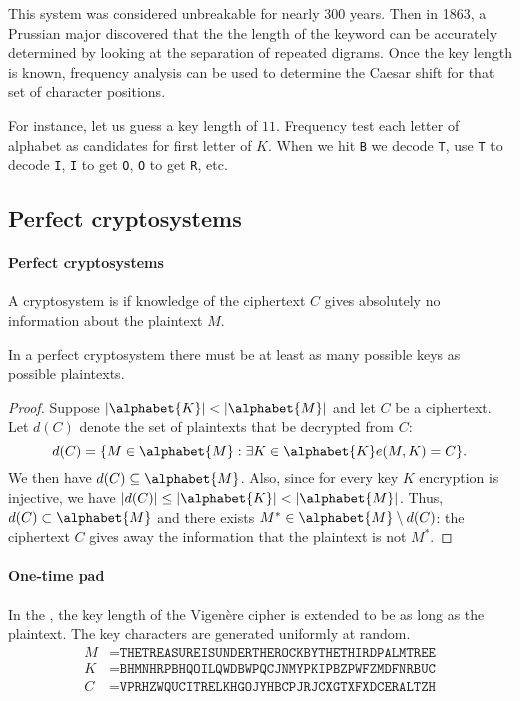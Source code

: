 \documentclass[a4paper, 11pt, openany]{book}
\begin{document}
This system was considered unbreakable for nearly 300 years. Then in 1863, a Prussian major discovered that the the length of the keyword can be accurately determined by looking at the separation of repeated digrams. Once the key length is known, frequency analysis can be used to determine the Caesar shift for that set of character positions.

For instance, let us guess a key length of $11$.
Frequency test each letter of alphabet as candidates for first letter of $K$. When we hit \texttt{B} we decode \texttt{T}, use \texttt{T} to decode \texttt{I}, \texttt{I} to get \texttt{O}, \texttt{O} to get \texttt{R}, etc.









\subsection{Perfect cryptosystems}

\paragraph{Perfect cryptosystems}
A cryptosystem is  if knowledge of the ciphertext $C$ gives absolutely no information about the plaintext $M$.

\begin{theorem}
In a perfect cryptosystem there must be at least as many possible keys as possible plaintexts.
\end{theorem}

\begin{proof}
Suppose $|\alphabet{K}| < |\alphabet{M}|$ and let $C$ be a ciphertext. Let $d(C)$ denote the set of plaintexts that be decrypted from $C$:
\[
    d(C) = \{M \in \alphabet{M} : \exists K \in \alphabet{K} e(M,K) = C\}.
\]
We then have $d(C) \subseteq \alphabet{M}$. Also, since for every key $K$ encryption is injective, we have $|d(C)| \le |\alphabet{K}| < |\alphabet{M}|$. Thus, $d(C) \subset \alphabet{M}$ and there exists $M^* \in \alphabet{M} \setminus d(C)$: the ciphertext $C$ gives away the information that the plaintext is not $M^*$.
\end{proof}


\paragraph{One-time pad}
In the , the key length of the Vigen\`ere cipher is extended to be as long as the plaintext. The key characters are generated uniformly at random.
\begin{align*}
    M &= \texttt{THETREASUREISUNDERTHEROCKBYTHETHIRDPALMTREE}\\
    K &= \texttt{BHMNHRPBHQOILQWDBWPQCJNMYPKIPBZPWFZMDFNRBUC}\\
    C &= \texttt{VPRHZWQUCITRELKHGOJYHBCPJRJCXGTXFXDCERALTZH}
\end{align*}
\end{document}
